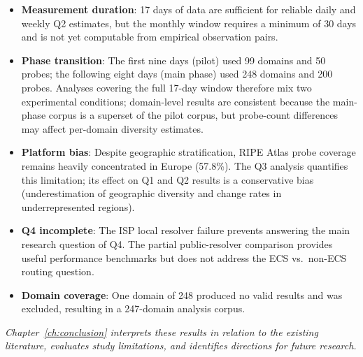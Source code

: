 \begin{itemize}
  \item \textbf{Measurement duration}: 17 days of data are sufficient for reliable daily and weekly Q2 estimates, but the monthly window requires a minimum of 30 days and is not yet computable from empirical observation pairs.
  \item \textbf{Phase transition}: The first nine days (pilot) used 99 domains and 50 probes; the following eight days (main phase) used 248 domains and 200 probes. Analyses covering the full 17-day window therefore mix two experimental conditions; domain-level results are consistent because the main-phase corpus is a superset of the pilot corpus, but probe-count differences may affect per-domain diversity estimates.
  \item \textbf{Platform bias}: Despite geographic stratification, RIPE Atlas probe coverage remains heavily concentrated in Europe (57.8\%). The Q3 analysis quantifies this limitation; its effect on Q1 and Q2 results is a conservative bias (underestimation of geographic diversity and change rates in underrepresented regions).
  \item \textbf{Q4 incomplete}: The ISP local resolver failure prevents answering the main research question of Q4. The partial public-resolver comparison provides useful performance benchmarks but does not address the ECS vs.\ non-ECS routing question.
  \item \textbf{Domain coverage}: One domain of 248 produced no valid results and was excluded, resulting in a 247-domain analysis corpus.
\end{itemize}
\bigskip
\textit{Chapter~\ref{ch:conclusion} interprets these results in relation to the existing literature, evaluates study limitations, and identifies directions for future research.}
